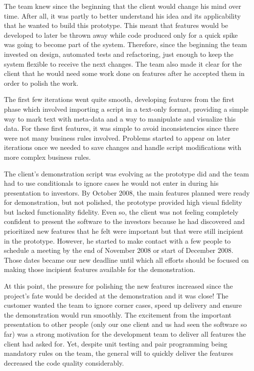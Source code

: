\documentclass[lnbip]{svmultln}
\newcommand{\mari}[1]{\footnote{MARI: #1}}
\begin{document}
The team knew since the beginning that the client would change his
mind over time. After all, it was partly to better understand his idea
and its applicability that he wanted to build this prototype. This
meant that features would be developed to later be thrown away while
code produced only for a quick spike was going to become part of the
system. Therefore, since the beginning the team invested on design,
automated tests and refactoring, just enough to keep the system
flexible to receive the next changes. The team also made it clear for
the client that he would need some work done on features after he
accepted them in order to polish the work.

The first few iterations went quite smooth, developing features from
the first phase which involved importing a script in a text-only
format, providing a simple way to mark text with meta-data and a way
to manipulate and visualize this data. For these first features, it
was simple to avoid inconsistencies since there were not many business
rules involved. Problems started to appear on later iterations once we
needed to save changes and handle script modifications with more
complex business rules.

The client's demonstration script was evolving as the prototype did
and the team had to use conditionals to ignore cases he would not
enter in during his presentation to investors. By October 2008, the
main features planned were ready for demonstration, but not polished,
the prototype provided high visual fidelity but lacked functionality
fidelity. Even so, the client was not feeling completely confident to
present the software to the investors because he had discovered and
prioritized new features that he felt were important but that were
still incipient in the prototype. However, he started to make contact
with a few people to schedule a meeting by the end of November 2008 or
start of December 2008. Those dates became our new deadline until
which all efforts should be focused on making those incipient features
available for the demonstration.

At this point, the pressure for polishing the new features increased
since the project's fate would be decided at the demonstration and it
was close! The customer wanted the team to ignore corner cases, speed
up delivery and ensure the demonstration would run smoothly. The
excitement from the important presentation to other people (only our
one client and us had seen the software so far) was a strong
motivation for the development team to deliver all features the client
had asked for. Yet, despite unit testing and pair programming being
mandatory rules on the team, the general will to quickly deliver the
features decreased the code quality considerably.
\end{document}
